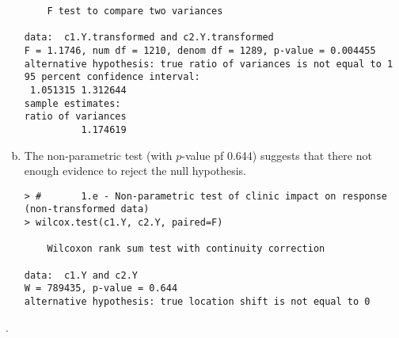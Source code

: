 \documentclass[a4paper, 10pt]{article}
\newcounter{prob_num}
\newcommand{\problem}{\vspace{20pt}\arabic{prob_num}.\stepcounter{prob_num}\par}
\begin{document}
\begin{enumerate}[(a)]
{\begin{verbatim}
	F test to compare two variances

data:  c1.Y.transformed and c2.Y.transformed 
F = 1.1746, num df = 1210, denom df = 1289, p-value = 0.004455
alternative hypothesis: true ratio of variances is not equal to 1 
95 percent confidence interval:
 1.051315 1.312644 
sample estimates:
ratio of variances 
          1.174619
\end{verbatim} }

\item The non-parametric test (with $p$-value pf 0.644) suggests that there not enough evidence to reject the null hypothesis.
{\scriptsize \begin{verbatim}
> #       1.e - Non-parametric test of clinic impact on response (non-transformed data)
> wilcox.test(c1.Y, c2.Y, paired=F)

	Wilcoxon rank sum test with continuity correction

data:  c1.Y and c2.Y 
W = 789435, p-value = 0.644
alternative hypothesis: true location shift is not equal to 0
\end{verbatim} }
\end{enumerate}

\problem
\end{document}
